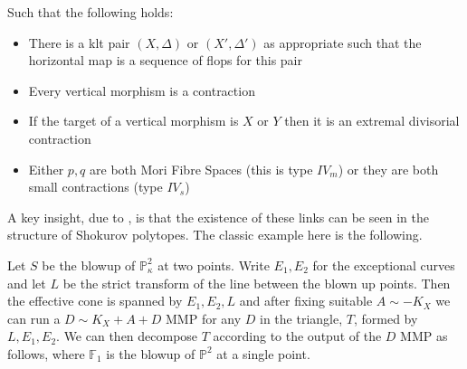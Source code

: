 \documentclass[a4paper,12pt]{book}
\begin{document}
	Such that the following holds:
	\begin{itemize}
		\item There is a klt pair $(X,\Delta)$ or $(X',\Delta')$ as appropriate such that the horizontal map is a sequence of flops for this pair
		\item Every vertical morphism is a contraction
		\item If the target of a vertical morphism is $X$ or $Y$ then it is an extremal divisorial contraction
		\item Either $p,q$ are both Mori Fibre Spaces (this is type $IV_{m}$) or they are both small contractions (type $IV_{s}$)
	\end{itemize}
	
	A key insight, due to \cite{hacon2009sarkisov}, is that the existence of these links can be seen in the structure of Shokurov polytopes. The classic example here is the following.
	
	Let $S$ be the blowup of $\mathbb{P}^{2}_{\kappa}$ at two points. Write $E_{1},E_{2}$ for the exceptional curves and let $L$ be the strict transform of the line between the blown up points. Then the effective cone is spanned by $E_{1},E_{2},L$ and after fixing suitable $A \sim -K_{X}$ we can run a $D \sim K_{X}+A+D$ MMP for any $D$ in the triangle, $T$, formed by $L,E_{1},E_{2}$. We can then decompose $T$ according to the output of the $D$ MMP as follows, where $\mathbb{F}_{1}$ is the blowup of $\mathbb{P}^{2}$ at a single point.
	 
\end{document}
